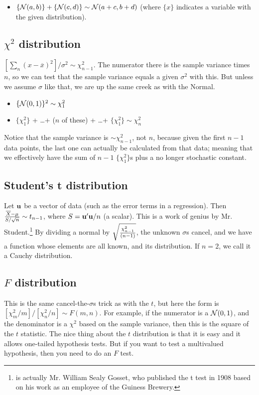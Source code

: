 \begin{itemize}
\item $\{{\cal N} (a,b)\} + \{{\cal N} (c,d)\} \sim {\cal N}
(a+c,b+d)$ (where $\{x\}$ indicates a variable with the given distribution).
\end{itemize}

\subsection{$\chi^2$ distribution} $[\sum_n (x-\overline
x)^2]/\sigma^2\sim \chi^2_{n-1}$. The numerator there is the sample
variance times $n$, so we can test that the sample variance equals a
given $\sigma^2$ with this. But unless we assume $\sigma$ like that,
we are up the same creek as with the Normal.

\begin{itemize}
\item $\{{\cal N} (0,1)\}^2 \sim \chi^2_1$

\item $\{\chi^2_1\}$ + \dots + ($n$ of these) + \dots + $\{\chi^2_1\} \sim \chi^2_n$

\end{itemize}			\label{chisq}

Notice that the sample variance is $\sim
\chi^2_{n-1}$, not $n$, because given the first $n-1$ data points, the
last one can actually be calculated from that data; meaning that we
effectively have the sum of $n-1$ $\{\chi^2_1\}$s plus a no longer
stochastic constant.

\subsection{Student's t distribution} Let ${\bf u}$ be
a vector of data (such as the error terms in a regression). Then
${\overline X - \mu \over S/\sqrt{n}}\sim
t_{n-1}$, where $S={\bf u}'{\bf u}/n$ (a scalar). This is a work of genius by
Mr. Student.\footnote{ is actually Mr. William Sealy
Gosset, who published the t test in 1908 based on his work as an employee
of the Guiness Brewery.  }
By dividing a normal by $\sqrt{\chi^2_{n-1}\over (n-1)}$, the unknown
$\sigma$s cancel, and we have a function whose elements are all known,
and its distribution.  If $n=2$, we call it a Cauchy distribution.
\label{tstat}


\subsection{$F$ distribution}  This is the same cancel-the-$\sigma$s trick as with the $t$, but here the form
is $[\chi^2_m/m]/[\chi^2_n/n]\sim F(m,n)$. For example, if the numerator
is a ${\cal N}(0,1)$, and the denominator is a $\chi^2$ based on the
sample variance, then this is the square of the $t$ statistic.
The nice thing about the $t$ distribution is that it is easy and it
allows one-tailed hypothesis tests. But if you want to test a
multivalued hypothesis, then you need to do an $F$ test.

